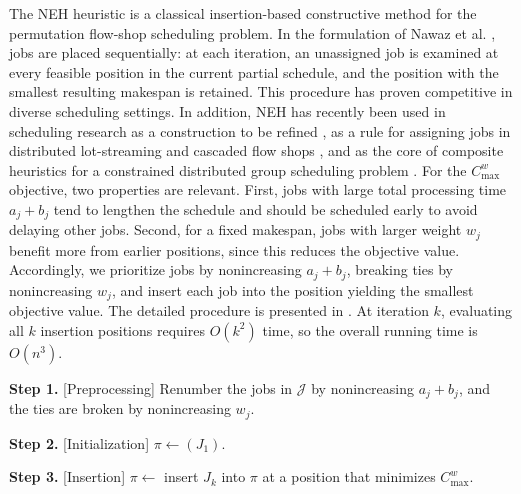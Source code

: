 ﻿\documentclass[12pt]{article} \textheight=24.5cm \textwidth=16.5cm \parskip = 0.165cm
\begin{document}
\begin{sloppypar}
        The NEH heuristic is a classical insertion-based constructive method for the permutation flow-shop scheduling problem. In the formulation of Nawaz et al. \cite{NawazEnscoreHam1983Omega}, jobs are placed sequentially: at each iteration, an unassigned job is examined at every feasible position in the current partial schedule, and the position with the smallest resulting makespan is retained. This procedure has proven competitive in diverse scheduling settings. In addition, NEH has recently been used in scheduling research as a construction to be refined \citep{PukaSkalnaIwona2024COR}, as a rule for assigning jobs in distributed lot-streaming and cascaded flow shops \citep{ShaoShaoPi2023ESWA,WangPanSang2024RCIM}, and as the core of composite heuristics for a constrained distributed group scheduling problem \citep{WangPanGao2024CIE}. For the $C_{\max}^w$ objective, two properties are relevant. First, jobs with large total processing time $a_j+b_j$ tend to lengthen the schedule and should be scheduled early to avoid delaying other jobs. Second, for a fixed makespan, jobs with larger weight $w_j$ benefit more from earlier positions, since this reduces the objective value. Accordingly, we prioritize jobs by nonincreasing $a_j+b_j$, breaking ties by nonincreasing $w_j$, and insert each job into the position yielding the smallest objective value. The detailed procedure is presented in . At iteration $k$, evaluating all $k$ insertion positions requires $O(k^2)$ time, so the overall running time is $O(n^3)$.
        
        \begin{algorithm}[H]
            \small
            \linespread{1.2}\selectfont
            \SetAlgoLined
            \DontPrintSemicolon
            \caption{NEH heuristic for $F2 \mid \mid C_{\max}^w$}\label{Alg-NEH}
            \BlankLine
            \textbf{Step 1.} [Preprocessing] Renumber the jobs in $\mathcal{J}$ by nonincreasing $a_j+b_j$, and the ties are broken by nonincreasing $w_j$.  \;
            
            \textbf{Step 2.} [Initialization] $\pi \gets (J_{1})$. \;
            
            \textbf{Step 3.} [Insertion] 
            {
                $\pi \gets$ insert $J_{k}$ into $\pi$ at a position that minimizes $C_{\max}^w$. \;
            }
        \end{algorithm}
        

\end{sloppypar}
\end{document}
